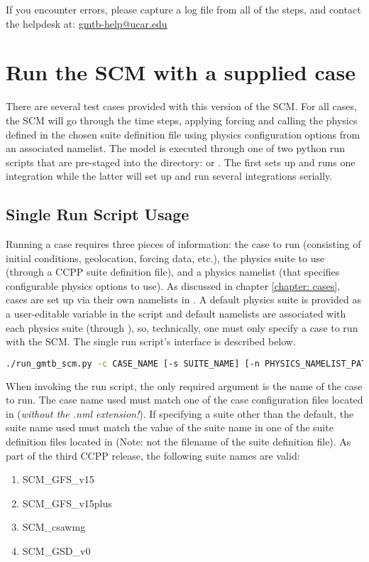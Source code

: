 If you encounter errors, please capture a log file from all of the steps, and contact the helpdesk at: \url{gmtb-help@ucar.edu}

\section{Run the SCM with a supplied case}
There are several test cases provided with this version of the SCM. For all cases, the SCM will go through the time steps, applying forcing and calling the physics defined in the chosen suite definition file using physics configuration options from an associated namelist. The model is executed through one of two python run scripts that are pre-staged into the  directory:  or . The first sets up and runs one integration while the latter will set up and run several integrations serially. 

\subsection{Single Run Script Usage} \label{subsection: singlerunscript}
Running a case requires three pieces of information: the case to run (consisting of initial conditions, geolocation, forcing data, etc.), the physics suite to use (through a CCPP suite definition file), and a physics namelist (that specifies configurable physics options to use). As discussed in chapter \ref{chapter: cases}, cases are set up via their own namelists in . A default physics suite is provided as a user-editable variable in the script and default namelists are associated with each physics suite (through ), so, technically, one must only specify a case to run with the SCM. The single run script's interface is described below.

\begin{lstlisting}[language=bash]
./run_gmtb_scm.py -c CASE_NAME [-s SUITE_NAME] [-n PHYSICS_NAMELIST_PATH] [-g]
\end{lstlisting}

When invoking the run script, the only required argument is the name of the case to run. The case name used must match one of the case configuration files located in  (\emph{without the .nml extension!}). If specifying a suite other than the default, the suite name used must match the value of the suite name in one of the suite definition files located in  (Note: not the filename of the suite definition file). As part of the third CCPP release, the following suite names are valid:
\begin{enumerate}
\item SCM\_GFS\_v15
\item SCM\_GFS\_v15plus
\item SCM\_csawmg
\item SCM\_GSD\_v0
\end{enumerate}

